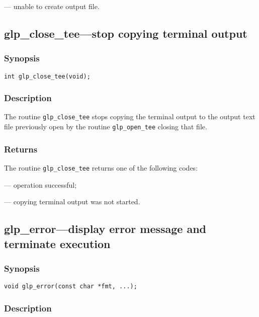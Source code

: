  --- unable to create output file.

\newpage

\subsection{glp\_close\_tee---stop copying terminal output}

\subsubsection*{Synopsis}

\begin{verbatim}
int glp_close_tee(void);
\end{verbatim}

\subsubsection*{Description}

The routine \verb|glp_close_tee| stops copying the terminal output to
the output text file previously open by the routine \verb|glp_open_tee|
closing that file.

\subsubsection*{Returns}

The routine \verb|glp_close_tee| returns one of the following codes:

 --- operation successful;

 --- copying terminal output was not started.

\subsection{glp\_error---display error message and terminate execution}

\subsubsection*{Synopsis}

\begin{verbatim}
void glp_error(const char *fmt, ...);
\end{verbatim}

\subsubsection*{Description}

